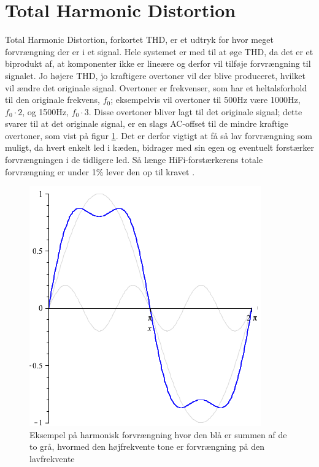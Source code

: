 \section{Total Harmonic Distortion}
\label{thd}
Total Harmonic Distortion, forkortet THD, er et udtryk for hvor meget forvrængning der er i et signal.  Hele systemet er med til at øge THD, da det er et biprodukt af, at komponenter ikke er lineære og derfor vil tilføje forvrængning til signalet. Jo højere THD, jo kraftigere overtoner vil der blive produceret, hvilket vil ændre det originale signal. Overtoner er frekvenser, som har et heltalsforhold til den originale frekvens, $f_0$; eksempelvis vil overtoner til 500Hz være 1000Hz, $f_0\cdot2$, og 1500Hz, $f_0\cdot3$. Disse overtoner bliver lagt til det originale signal; dette svarer til at det originale signal, er en slags AC-offset til de mindre kraftige overtoner, som vist på figur \ref{fig:harmonic_distortion}. Det er derfor vigtigt at få så lav forvrængning som muligt, da hvert enkelt led i kæden, bidrager med sin egen og eventuelt forstærker forvrængningen i de tidligere led. Så længe HiFi-forstærkerens totale forvrængning er under 1\% lever den op til kravet \cite{DIN45500}.%

\begin{figure}[h]
\centering
\includegraphics[scale=.4]{valg_af_loesning/thd/thdsamlet.png}
\caption{Eksempel på harmonisk forvrængning hvor den blå er summen af de to grå, hvormed den højfrekvente tone er forvrængning på den lavfrekvente}
\label{fig:harmonic_distortion}
\end{figure}
